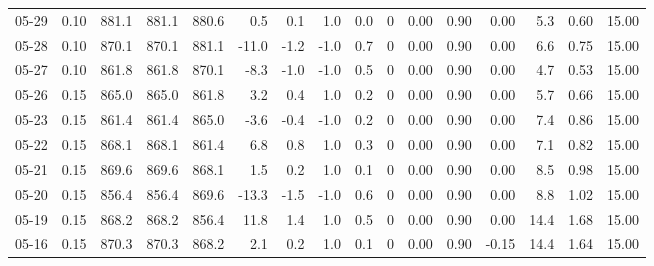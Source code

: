 \begin{threeparttable}
{\begin{tabular}{lrrrrrrrrrrrrrrr}
  05-29 &     0.10 & 881.1 & 881.1 & 880.6 &        0.5 &            0.1 &                      1.0 &                 0.0 &              0 &       0.00 &      0.90 &           0.00 &              5.3 &            0.60 &                  15.00 \\
  05-28 &     0.10 & 870.1 & 870.1 & 881.1 &      -11.0 &           -1.2 &                     -1.0 &                 0.7 &              0 &       0.00 &      0.90 &           0.00 &              6.6 &            0.75 &                  15.00 \\
  05-27 &     0.10 & 861.8 & 861.8 & 870.1 &       -8.3 &           -1.0 &                     -1.0 &                 0.5 &              0 &       0.00 &      0.90 &           0.00 &              4.7 &            0.53 &                  15.00 \\
  05-26 &     0.15 & 865.0 & 865.0 & 861.8 &        3.2 &            0.4 &                      1.0 &                 0.2 &              0 &       0.00 &      0.90 &           0.00 &              5.7 &            0.66 &                  15.00 \\
  05-23 &     0.15 & 861.4 & 861.4 & 865.0 &       -3.6 &           -0.4 &                     -1.0 &                 0.2 &              0 &       0.00 &      0.90 &           0.00 &              7.4 &            0.86 &                  15.00 \\
  05-22 &     0.15 & 868.1 & 868.1 & 861.4 &        6.8 &            0.8 &                      1.0 &                 0.3 &              0 &       0.00 &      0.90 &           0.00 &              7.1 &            0.82 &                  15.00 \\
  05-21 &     0.15 & 869.6 & 869.6 & 868.1 &        1.5 &            0.2 &                      1.0 &                 0.1 &              0 &       0.00 &      0.90 &           0.00 &              8.5 &            0.98 &                  15.00 \\
  05-20 &     0.15 & 856.4 & 856.4 & 869.6 &      -13.3 &           -1.5 &                     -1.0 &                 0.6 &              0 &       0.00 &      0.90 &           0.00 &              8.8 &            1.02 &                  15.00 \\
  05-19 &     0.15 & 868.2 & 868.2 & 856.4 &       11.8 &            1.4 &                      1.0 &                 0.5 &              0 &       0.00 &      0.90 &           0.00 &             14.4 &            1.68 &                  15.00 \\
  05-16 &     0.15 & 870.3 & 870.3 & 868.2 &        2.1 &            0.2 &                      1.0 &                 0.1 &              0 &       0.00 &      0.90 &          -0.15 &             14.4 &            1.64 &                  15.00 \\

\end{tabular}}
\end{threeparttable}
